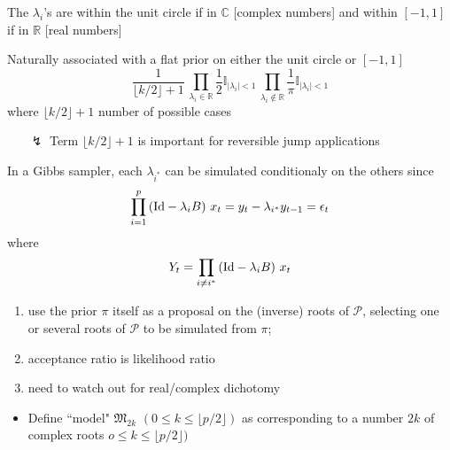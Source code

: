 \begin{slide}
 The $\lambda_i$'s are within the unit circle 
if in $\mathbb{C}$ [complex numbers] and within $[-1,1]$ if in $\mathbb{R}$ 
[real numbers]

\vs\pause
Naturally associated with a flat prior on either the unit circle or $[-1,1]$
$$
\frac{1}{\lfloor k/2 \rfloor+1}
\,\prod_{\lambda_i\in{\mathbb R}} \frac{1}{2}{\mathbb I}_{|\lambda_i|<1}
\,\prod_{\lambda_i\not\in{\mathbb R}} \frac{1}{\pi}{\mathbb I}_{|\lambda_i|<1}
$$
where $\lfloor k/2 \rfloor+1$ number of possible cases

\vs\pause\begin{itemize}
\item[$\lightning$] Term $\lfloor k/2 \rfloor+1$ is important 
for reversible jump applications
\end{itemize}

\end{slide}\begin{slide}

In a Gibbs sampler, each $\lambda_{i^*}$ can be simulated conditionaly on the others since
$$
\prod_{i=1}^p \left( \hbox{Id} - \lambda_i B\right) \,x_t =
y_t - \lambda_{i^*} y_{t-1} = \epsilon_t
$$
where
$$
Y_t = \prod_{i\ne i^*} \left( \hbox{Id} - \lambda_i B\right) \,x_t
$$

\end{slide}\begin{slide}

\begin{enumerate}
\item use the prior $\pi$ itself as a proposal on
the (inverse) roots of $\mathcal{P}$, selecting one
or several roots of $\mathcal{P}$ to be simulated from $\pi$;
\item acceptance ratio is likelihood ratio
\item need to watch out for real/complex dichotomy
\end{enumerate}

\end{slide}\begin{slide}

\small\begin{itemize}
\item Define ``model" $\mathfrak{M}_{2k}$ $(0\le k\le \lfloor
p/2 \rfloor)$ as corresponding to a number $2k$ of complex roots
$o\le k\le \lfloor p/2 \rfloor)$


\end{itemize}
\end{slide}
